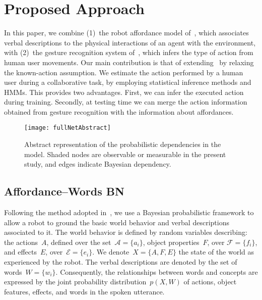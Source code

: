 
\section{Proposed Approach}


In this paper, we combine (1)~the robot affordance model of~\cite{salvi:2012:smcb}, which associates verbal descriptions to the physical interactions of an agent with the environment, with (2)~the gesture recognition system of~\cite{saponaro:2013:crhri}, which infers the type of action from human user movements. Our main contribution is that of extending~\cite{salvi:2012:smcb} by relaxing the known-action assumption. We estimate the action performed by a human user during a \hr{} collaborative task, by employing statistical inference methods and \acp{HMM}. This provides two advantages. First, we can infer the executed action during training. Secondly, at testing time we can merge the action information obtained from gesture recognition with the information about affordances.

\begin{figure}
  \centering
  \texttt{[image: fullNetAbstract]}
  \caption{Abstract representation of the probabilistic dependencies in the model. Shaded nodes are observable or measurable in the present study, and edges indicate Bayesian dependency.}
  \label{fig:model}
\end{figure}

\subsection{Affordance--Words \acl{BN}}
\label{sec:bn}

Following the method adopted in~\cite{salvi:2012:smcb}, we use a Bayesian probabilistic framework to allow a robot to ground the basic world behavior and verbal descriptions associated to it. The world behavior is defined by random variables describing: the actions~$A$, defined over the set~$\mathcal{A} = \{a_i\}$, object properties~$F$, over $\mathcal{F} = \{f_i\}$, and effects~$E$, over~$\mathcal{E} = \{e_i\}$. We denote~$X = \{A, F, E\}$ the state of the world as experienced by the robot. The verbal descriptions are denoted by the set of words~$W = \{w_i\}$. Consequently, the relationships between words and concepts are expressed by the joint probability distribution~$p(X,W)$ of actions, object features, effects, and words in the spoken utterance.

